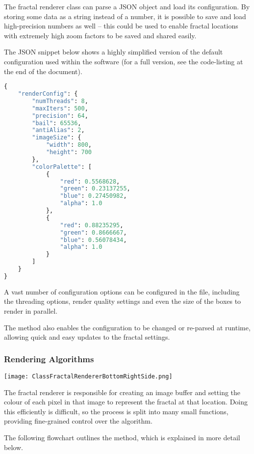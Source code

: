 The fractal renderer class can parse a JSON object and load its configuration. By storing some data as a string instead of a number, it is possible to save and load high-precision numbers as well -- this could be used to enable fractal locations with extremely high zoom factors to be saved and shared easily.

\vspace{0.5cm}
\noindent
The JSON snippet below shows a highly simplified version of the default configuration used within the software (for a full version, see the code-listing at the end of the document).

\begin{lstlisting}[language=python]
{
	"renderConfig": {
		"numThreads": 8,
		"maxIters": 500,
		"precision": 64,
		"bail": 65536,
		"antiAlias": 2,
		"imageSize": {
			"width": 800,
			"height": 700
		},
		"colorPalette": [
			{
				"red": 0.5568628,
				"green": 0.23137255,
				"blue": 0.27450982,
				"alpha": 1.0
			},
			{
				"red": 0.88235295,
				"green": 0.8666667,
				"blue": 0.56078434,
				"alpha": 1.0
			}
		]
	}
}
\end{lstlisting}

A vast number of configuration options can be configured in the file, including the threading options, render quality settings and even the size of the boxes to render in parallel.

The  method also enables the configuration to be changed or re-parsed at runtime, allowing quick and easy updates to the fractal settings.

\subsubsection{Rendering Algorithms}

\FloatBarrier
\begin{figure*}[htp]
    \centering
    \texttt{[image: ClassFractalRendererBottomRightSide.png]}
\end{figure*}
\FloatBarrier

The fractal renderer is responsible for creating an image buffer and setting the colour of each pixel in that image to represent the fractal at that location. Doing this efficiently is difficult, so the process is split into many small functions, providing fine-grained control over the algorithm.

\vspace{0.5cm}
\noindent
The following flowchart outlines the  method, which is explained in more detail below.
\vspace{0.5cm}

